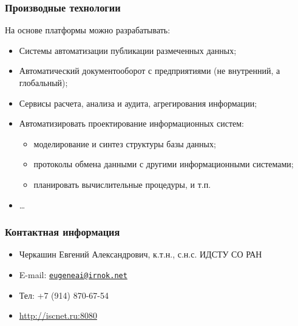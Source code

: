 \documentclass[10pt]{beamer}
\begin{document}
\begin{frame}
  \frametitle{Производные технологии}
      На основе платформы можно разрабатывать:
      \begin{itemize}
      \item Системы автоматизации публикации размеченных данных;
      \item Автоматический документооборот с предприятиями (не внутренний, а глобальный);
      \item Сервисы расчета, анализа и аудита, агрегирования информации;
      \item Автоматизировать проектирование информационных систем:
        \begin{itemize}
        \item моделирование и синтез структуры базы данных;
        \item протоколы обмена данными с другими информационными системами;
        \item планировать вычислительные процедуры, и т.п.
        \end{itemize}
      \item \ldots
      \end{itemize}
\end{frame}

\begin{frame}
  \frametitle{Контактная информация}
  \begin{block}{}
    \begin{itemize}
    \item Черкашин Евгений Александрович, к.т.н., с.н.с. ИДСТУ СО РАН
    \item E-mail: \href{mailto:eugeneai@irnok.net}{\texttt{eugeneai@irnok.net}}
    \item Тел: +7 (914) 870-67-54
    \item \url{http://iscnet.ru:8080}
    \end{itemize}
  \end{block}
\end{frame}



\end{document}
